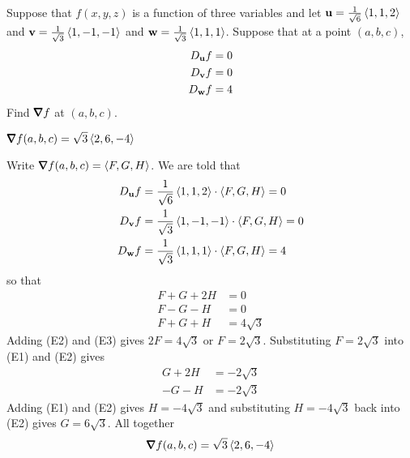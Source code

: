\begin{question}[M200 2014D] %
Suppose that $f(x,y,z)$ is a function of three variables and let 
$\mathbf{u} = \frac{1}{\sqrt{6}} \left< 1, 1, 2\right>$ 
and $\mathbf{v} = \frac{1}{\sqrt{3}} \left< 1, -1, -1\right>$ 
and $\mathbf{w} = \frac{1}{\sqrt{3}} \left< 1, 1, 1\right>$. 
Suppose that at a point $(a,b,c)$,
\begin{align*}
D_{\mathbf{u}} f&=0 \\
D_{\mathbf{v}} f&=0 \\
D_{\mathbf{w}} f&=4
\end{align*}
Find $\vnabla f$ at $(a,b,c)$.
\end{question}

%

\begin{answer}
$\vnabla f(a,b,c) =\sqrt{3} \llt 2,6,-4\rgt$
\end{answer}

\begin{solution}
Write $\vnabla f(a,b,c) =\llt F,G,H\rgt$. We are told that
\begin{align*}
D_{\mathbf{u}} f&=\frac{1}{\sqrt{6}} \left< 1, 1, 2\right> \cdot \left< F,G,H\right> = 0 \\
D_{\mathbf{v}} f&=\frac{1}{\sqrt{3}} \left< 1, -1, -1\right> \cdot \left< F,G,H\right> = 0 \\
D_{\mathbf{w}} f&=\frac{1}{\sqrt{3}} \left< 1, 1, 1\right> \cdot \left< F,G,H\right> = 4
\end{align*}
so that
\begin{align*}
 F + G + 2H &= 0 \tag{E1}\\
 F - G - H &= 0 \tag{E2}\\
 F + G + H &= 4\sqrt{3} \tag{E3}
\end{align*}
Adding (E2) and (E3) gives $2F=4\sqrt{3}$ or $F=2\sqrt{3}$.
Substituting $F=2\sqrt{3}$ into (E1) and (E2) gives
\begin{align*}
   G + 2H &= -2\sqrt{3} \tag{E1}\\
 - G - H &=  -2\sqrt{3} \tag{E2}
\end{align*}
Adding (E1) and (E2) gives $H=-4\sqrt{3}$ and substituting 
$H=-4\sqrt{3}$ back into (E2) gives $G=6\sqrt{3}$. All together
\begin{equation*}
\vnabla f(a,b,c) =\sqrt{3} \llt 2,6,-4\rgt
\end{equation*}
\end{solution}


